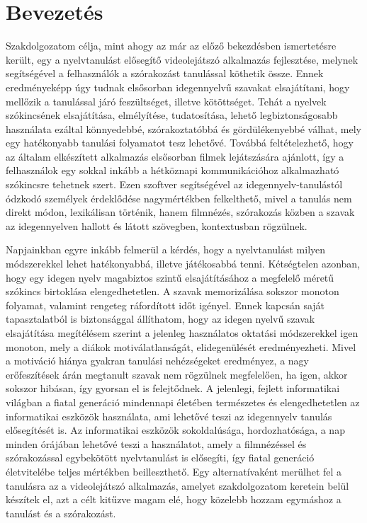 \chapter*{Bevezetés}
Szakdolgozatom célja, mint ahogy az már az előző bekezdésben ismertetésre került, egy a nyelvtanulást elősegítő videolejátszó alkalmazás fejlesztése, melynek segítségével a felhasználók a szórakozást tanulással köthetik össze. Ennek eredményeképp úgy tudnak elsősorban idegennyelvű szavakat elsajátítani, hogy mellőzik a tanulással járó feszültséget, illetve kötöttséget. Tehát a nyelvek szókincsének elsajátítása, elmélyítése, tudatosítása, lehető legbiztonságosabb használata ezáltal könnyedebbé, szórakoztatóbbá és gördülékenyebbé válhat, mely egy hatékonyabb tanulási folyamatot tesz lehetővé. Továbbá feltételezhető, hogy az általam elkészített alkalmazás elsősorban filmek lejátszására ajánlott, így a felhasználok egy sokkal inkább a hétköznapi kommunikációhoz alkalmazható szókincsre tehetnek szert. Ezen szoftver segítségével az idegennyelv-tanulástól ódzkodó személyek érdeklődése nagymértékben felkelthető, mivel a tanulás nem direkt módon, lexikálisan történik, hanem filmnézés, szórakozás közben a szavak az idegennyelven hallott és látott szövegben, kontextusban rögzülnek. 

Napjainkban egyre inkább felmerül a kérdés, hogy a nyelvtanulást milyen módszerekkel lehet hatékonyabbá, illetve játékosabbá tenni. Kétségtelen azonban, hogy egy idegen nyelv magabiztos szintű elsajátításához a megfelelő méretű szókincs birtoklása elengedhetetlen. A szavak memorizálása sokszor monoton folyamat, valamint rengeteg ráfordított időt igényel. Ennek kapcsán saját tapasztalatból is biztonsággal állíthatom, hogy az idegen nyelvű szavak elsajátítása megítélésem szerint a jelenleg használatos oktatási módszerekkel igen monoton, mely a diákok motiválatlanságát, elidegenülését eredményezheti. Mivel a motiváció hiánya gyakran tanulási nehézségeket eredményez, a nagy erőfeszítések árán megtanult szavak nem rögzülnek megfelelően, ha igen, akkor sokszor hibásan, így gyorsan el is felejtődnek. A jelenlegi, fejlett informatikai világban a fiatal generáció mindennapi életében természetes és elengedhetetlen az informatikai eszközök használata, ami lehetővé teszi az idegennyelv tanulás elősegítését is. Az informatikai eszközök sokoldalúsága, hordozhatósága, a nap minden órájában lehetővé teszi a használatot, amely a filmnézéssel és szórakozással egybekötött nyelvtanulást is elősegíti, így fiatal generáció életvitelébe teljes mértékben beilleszthető.
 Egy alternatívaként merülhet fel a tanulásra az a videolejátszó alkalmazás, amelyet szakdolgozatom keretein belül készítek el, azt a célt kitűzve magam elé, hogy közelebb hozzam egymáshoz a tanulást és a szórakozást. 

